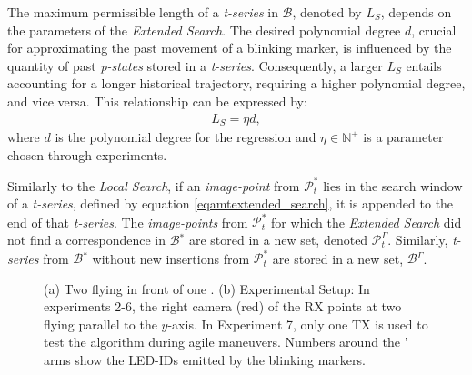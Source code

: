 \documentclass[lettersize,preprint]{elsarticle}
\newcommand{\B}{$\mathcal{B}$}
\newcommand{\ts}{\emph{t-series}}
\begin{document}
The maximum permissible length of a \ts{} in \B{}, denoted by $L_S$, depends on the parameters of the \emph{Extended Search}. 
The desired polynomial degree $d$, crucial for approximating the past movement of a blinking marker, is influenced by the quantity of past \emph{p-states} stored in a \ts{}. 
Consequently, a larger $L_S$ entails accounting for a longer historical trajectory, requiring a higher polynomial degree, and vice versa.
This relationship can be expressed by:
\begin{align}
L_S = \eta d\label{eqamtseq_length},
\end{align}
where $d$ is the polynomial degree for the regression and $\eta \in \mathbb{N}^+$ is a parameter chosen through experiments.

Similarly to the \emph{Local Search}, if an \emph{image-point} from $\mathcal{P}_t^*$ lies in the search window of a \ts{}, defined by equation \eqref{eqamtextended_search}, it is appended to the end of that \ts{}.
The \emph{image-points} from $\mathcal{P}_t^*$ for which the \emph{Extended Search} did not find a correspondence in \B{}$^*$ are stored in a new set, denoted $\mathcal{P}_t^\Gamma$. 
Similarly, \emph{t-series} from \B{}$^*$ without new insertions from $\mathcal{P}_t^*$ are stored in a new set, \B{}$^\Gamma$.

\begin{figure*}[!t]
  \centering
  \subfloat[\label{fig:eval:two_tx}]{
    \scalebox{1.1}{}
  } 
  \subfloat[\label{fig:eval:overview_graph}]{
    \scalebox{0.4}{}}
    \caption{(a) Two  flying in front of one . 
    (b) Experimental Setup:
    In experiments 2-6, the right camera (red) of the \gls{RX} points at two  flying parallel to the $y$-axis.
    In Experiment 7, only one \gls{TX} is used to test the algorithm during agile maneuvers.
    Numbers around the ' arms show the \gls{LED}-IDs emitted by the blinking markers.}
    \label{fig:eval:overview}
    \vspace*{-10pt}
\end{figure*}
\end{document}
